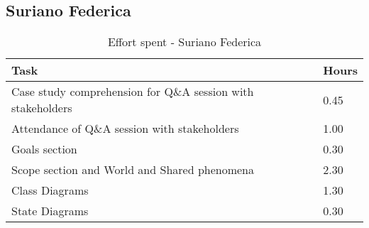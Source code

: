 \subsection{Suriano Federica}
\renewcommand{\arraystretch}{2}
\begin{longtable}{|m{9cm}|m{1.2cm}|}
\caption{Effort spent - Suriano Federica}\\
\hline
\endfirsthead
\endhead
\hline
\endlastfoot
\rowcolor{white!40!blue!70}
\textbf{Task} &\hfil {\textbf{Hours}}\\
\hline
Case study comprehension for Q\&A session with stakeholders & \hfil 0.45\\
Attendance of Q\&A session with stakeholders & \hfil 1.00\\
Goals section & \hfil 0.30\\
Scope section and World and Shared phenomena & \hfil 2.30\\
Class Diagrams & \hfil 1.30\\
State Diagrams & \hfil 0.30\\
\hline
\end{longtable}
